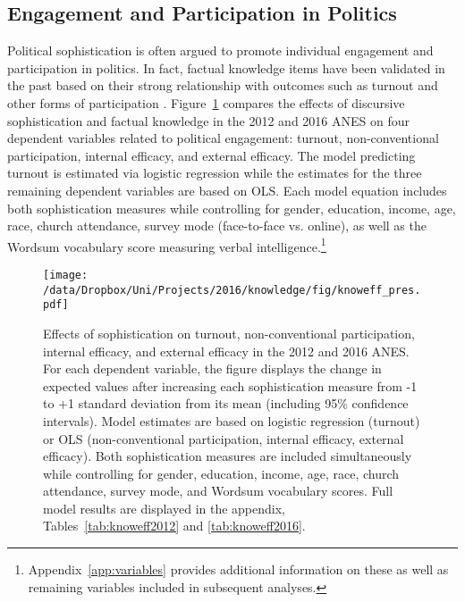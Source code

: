 \subsection*{Engagement and Participation in Politics}
Political sophistication is often argued to promote individual engagement and participation in politics. In fact, factual knowledge items have been validated in the past based on their strong relationship with outcomes such as turnout and other forms of participation \citep[230--233]{lupia2015uninformed}. Figure~\ref{fig:knoweff} compares the effects of discursive sophistication and factual knowledge in the 2012 and 2016 ANES on four dependent variables related to political engagement: turnout, non-conventional participation, internal efficacy, and external efficacy. The model predicting turnout is estimated via logistic regression while the estimates for the three remaining dependent variables are based on OLS. Each model equation includes both sophistication measures while controlling for gender, education, income, age, race, church attendance, survey mode (face-to-face vs. online), as well as the Wordsum vocabulary score measuring verbal intelligence.\footnote{Appendix~\ref{app:variables} provides additional information on these as well as remaining variables included in subsequent analyses.}

\begin{figure}[h]\centering
\texttt{[image: /data/Dropbox/Uni/Projects/2016/knowledge/fig/knoweff\_pres.pdf]}
\caption[Effects of sophistication on turnout, non-conventional participation, internal efficacy, and external efficacy in the 2012 and 2016 ANES]{Effects of sophistication on turnout, non-conventional participation, internal efficacy, and external efficacy in the 2012 and 2016 ANES. For each dependent variable, the figure displays the change in expected values after increasing each sophistication measure from -1 to +1 standard deviation from its mean (including 95\% confidence intervals). Model estimates are based on logistic regression (turnout) or OLS (non-conventional participation, internal efficacy, external efficacy). Both sophistication measures are included simultaneously while controlling for gender, education, income, age, race, church attendance, survey mode, and Wordsum vocabulary scores. Full model results are displayed in the appendix, Tables~\ref{tab:knoweff2012} and \ref{tab:knoweff2016}.}\label{fig:knoweff}
\end{figure}

